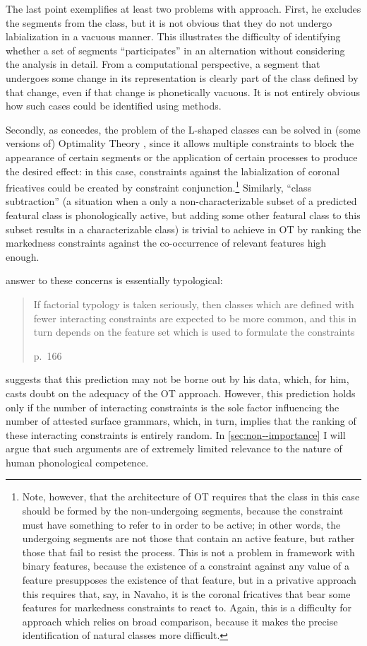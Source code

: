 The last point exemplifies at least two problems with  approach. First, he excludes the segments \ipa{[kʷ~xʷ~ɣʷ]} from the class, but it is not obvious that they do not undergo labialization in a vacuous manner. This illustrates the  difficulty of identifying whether a set of segments \enquote{participates} in an alternation without considering the analysis in detail. From a computational perspective, a segment that undergoes some change in its representation is clearly part of the class defined by that change, even if that change is phonetically vacuous. It is not entirely obvious how such cases could be identified using  methods.

Secondly, as \citet{mielke-diss} concedes, the problem of the L-shaped classes can be solved in (some versions of) Optimality Theory \citep{flemming05:_deriv}, since it allows multiple constraints to block the appearance of certain segments or the application of certain processes to produce the desired effect: in this case, constraints against the labialization of coronal fricatives could be created by constraint conjunction.\footnote{Note, however, that the architecture of OT requires that the class in this case should be formed by the non\hyp undergoing segments, because the constraint must have something to refer to in order to be active; in other words, the undergoing segments are not those that contain an active feature, but rather those that fail to resist the process. This is not a problem in framework with binary features, because the existence of a constraint against any value of a feature presupposes the existence of that feature, but in a privative approach this requires that, say, in Navaho, it is the coronal fricatives that bear some features for markedness constraints to react to. Again, this is a difficulty for  approach which relies on broad comparison, because it makes the precise identification of natural classes more difficult.} Similarly, \enquote{class subtraction} (\ie a situation when a only a non\hyp characterizable subset of a predicted featural class is phonologically active, but adding some other featural class to this subset results in a characterizable class) is trivial to achieve in OT by ranking the markedness constraints against the co\hyp occurrence of relevant features high enough.

 answer to these concerns is essentially typological: \blockquote[p.~166][.]{If factorial typology is taken seriously, then classes which are defined with fewer interacting constraints are expected to be more common, and this in turn depends on the feature set which is used to formulate the constraints}. \citet{mielke-diss} suggests that this prediction may not be borne out by his data, which, for him, casts doubt on the adequacy of the OT approach. However, this prediction holds only if the number of interacting constraints is the sole factor influencing the number of attested surface grammars, which, in turn, implies that the ranking of these interacting constraints is entirely random. In \cref{sec:non--importance} I will argue that such arguments are of extremely limited relevance to the nature of human phonological competence.

